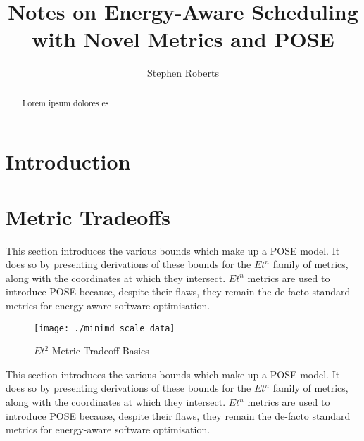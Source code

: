 \documentclass[a4paper]{article}
\title{Notes on Energy-Aware Scheduling with Novel Metrics and POSE}
\author{Stephen Roberts}
\date{}
\begin{document}
\maketitle

\begin{abstract}
Lorem ipsum dolores es

\end{abstract}


\section{Introduction}

\section{Metric Tradeoffs}
This section introduces the various bounds which make up a POSE model.
It does so by presenting derivations of these bounds for the $Et^n$ family of metrics, along with the coordinates at which they intersect.
$Et^n$ metrics are used to introduce POSE because, despite their flaws, they remain the de-facto standard metrics for energy-aware software optimisation.

\begin{figure}
\centering
\texttt{[image: ./minimd\_scale\_data]}
\caption{$Et^2$ Metric Tradeoff Basics}
\label{fig:et2scaledata}
\end{figure}

This section introduces the various bounds which make up a POSE model.
It does so by presenting derivations of these bounds for the $Et^n$ family of metrics, along with the coordinates at which they intersect.
$Et^n$ metrics are used to introduce POSE because, despite their flaws, they remain the de-facto standard metrics for energy-aware software optimisation.
\end{document}
